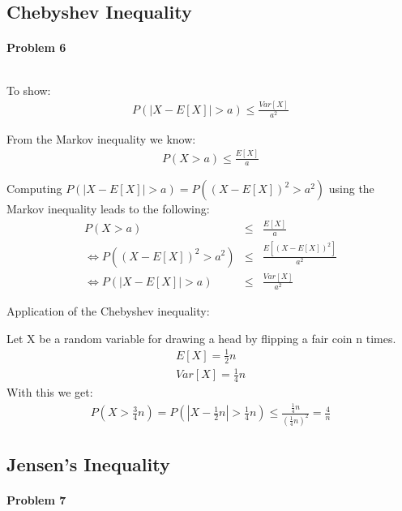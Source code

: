 \documentclass{article}
\begin{document}
\subsection{Chebyshev Inequality}

\paragraph*{Problem 6}
$\;$ 

To show:
\begin{eqnarray}
P(|X - E[X]| > a) \leq \frac{Var[X]}{a^2}
\end{eqnarray}

From the Markov inequality we know:
\begin{eqnarray}
P(X > a) \leq \frac{E[X]}{a}
\end{eqnarray}

Computing $P(|X - E[X]| > a) = P((X - E[X])^2 > a^2)$ using the Markov inequality leads to the following:
\begin{eqnarray}
P(X > a) &\leq& \frac{E[X]}{a}\\
\Leftrightarrow P((X - E[X])^2 > a^2) &\leq& \frac{E[(X - E[X])^2]}{a^2}\\
\Leftrightarrow P(|X - E[X]| > a) &\leq& \frac{Var[X]}{a^2}
\end{eqnarray}


Application of the Chebyshev inequality:

Let X be a random variable for drawing a head by flipping a fair coin n times.
\begin{eqnarray}
E[X] = \frac{1}{2}n\\
Var[X] = \frac{1}{4}n
\end{eqnarray}
With this we get:
\begin{eqnarray}
P(X > \frac{3}{4}n) = P\left(\left|X-\frac{1}{2}n\right| > \frac{1}{4}n\right) \leq \frac{\frac{1}{4}n}{\left(\frac{1}{4}n\right)^2} = \frac{4}{n}
\end{eqnarray}


\subsection{Jensen's Inequality}

\paragraph*{Problem 7}
$\;$ 
\end{document}
